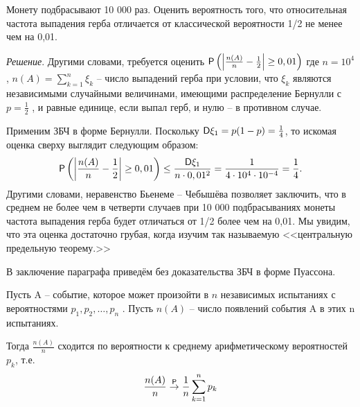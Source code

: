 \begin{example}
Монету подбрасывают 10 000 раз. Оценить вероятность
того, что относительная частота выпадения герба отличается от классической вероятности 1/2 не менее чем на 0,01.

\textit{Решение}. Другими словами, требуется оценить 
$
	\P\left(\left|
		\frac{n(A)}{n}-
		\frac{1}{2}
	\right|\geq0,01\right)
$
где $n = 10^4$ , $n(A) = \sum\limits_{k=1}^n \xi_k$  -- число выпадений герба при условии, что $\xi_k$ являются независимыми случайными величинами, имеющими распределение Бернулли с $p = \frac{1}{2}$ , и равные единице, если выпал герб, и нулю -- в противном случае. 

Применим ЗБЧ в форме Бернулли. Поскольку $\D\xi_1 = p(1 - p) = \frac{1}{4}$, то искомая оценка сверху выглядит следующим образом:
$$
	\P\left(\left|
		\frac{n(A)}{n}-
		\frac{1}{2}
	\right|\geq0,01\right)\leq
	\frac{\D\xi_1}{n\cdot 0,01^2}=\frac{1}{4\cdot10^4\cdot10^{-4}}=\frac{1}{4}.
$$
Другими словами, неравенство Бьенеме – Чебышёва позволяет заключить, что в среднем не более чем в четверти случаев при 10 000 подбрасываниях монеты частота выпадения герба будет отличаться от 1/2 более чем на 0,01. Мы увидим, что эта оценка достаточно грубая, когда изучим так называемую <<центральную предельную теорему.>>
\end{example}

В заключение параграфа приведём без доказательства ЗБЧ в форме Пуассона.
\begin{theorem}

Пусть A -- событие, которое может произойти в $n$ независимых испытаниях с вероятностями $p_1 , p_2 , \ldots , p_n$ . Пусть $n(A)$ -- число появлений события A в этих n испытаниях. 

Тогда $\frac{n(A)}{n}$ сходится по вероятности к среднему арифметическому вероятностей $p_k$, т.е.
$$
	\frac{n(A)}{n}\stackrel{\P}{\to}\frac{1}{n}\sum\limits_{k=1}^n p_k
$$

\end{theorem}
